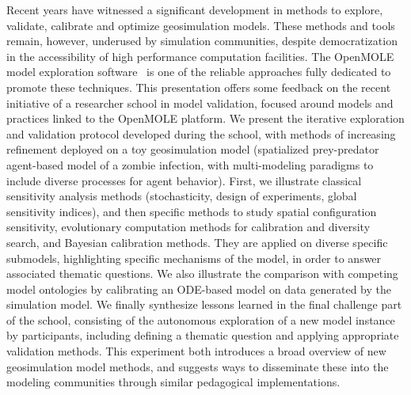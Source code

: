\documentclass[11pt]{article}
\begin{document}
Recent years have witnessed a significant development in methods to explore, validate, calibrate and optimize geosimulation models. These methods and tools remain, however, underused by simulation communities, despite democratization in the accessibility of high performance computation facilities. The OpenMOLE model exploration software~\citep{reuillon2013openmole} is one of the reliable approaches fully dedicated to promote these techniques. This presentation offers some feedback on the recent initiative of a researcher school in model validation, focused around models and practices linked to the OpenMOLE platform. We present the iterative exploration and validation protocol developed during the school, with methods of increasing refinement deployed on a toy geosimulation model (spatialized prey-predator agent-based model of a zombie infection, with multi-modeling paradigms to include diverse processes for agent behavior). First, we illustrate classical sensitivity analysis methods (stochasticity, design of experiments, global sensitivity indices), and then specific methods to study spatial configuration sensitivity, evolutionary computation methods for calibration and diversity search, and Bayesian calibration methods. They are applied on diverse specific submodels, highlighting specific mechanisms of the model, in order to answer associated thematic questions. We also illustrate the comparison with competing model ontologies by calibrating an ODE-based model on data generated by the simulation model. We finally synthesize lessons learned in the final challenge part of the school, consisting of the autonomous exploration of a new model instance by participants, including defining a thematic question and applying appropriate validation methods. This experiment both introduces a broad overview of new geosimulation model methods, and suggests ways to disseminate these into the modeling communities through similar pedagogical implementations.












\end{document}
